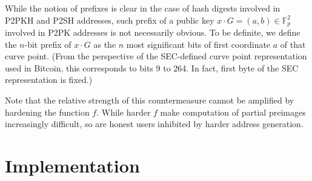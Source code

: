 \documentclass[a4paper,11pt,titlepage]{scrbook}
\begin{document}
While the notion of prefixes is clear in the case of hash digests involved in P2PKH and P2SH addresses, such prefix of a public key $x\cdot G = (a,b) \in \mathbb{F}_p^2$ involved in P2PK addresses is not necessarily obvious.
To be definite, we define the $n$-bit prefix of $x\cdot G$ as the $n$ most significant bits of first coordinate $a$ of that curve point. 
(From the perspective of the SEC-defined curve point representation used in Bitcoin, this corresponds to bits 9 to 264. In fact, first byte of the SEC representation is fixed.)

Note that the relative strength of this countermeasure cannot be amplified by hardening the function $f$.
While harder $f$ make computation of partial preimages increasingly difficult, so are honest users inhibited by harder address generation.

\section{Implementation}
\end{document}
